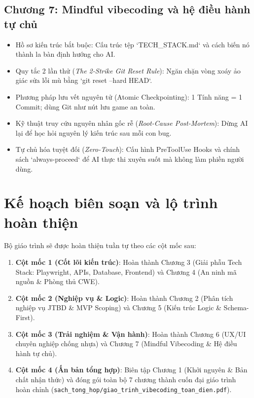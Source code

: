 \documentclass[a4paper,11pt]{article}
\begin{document}
\subsection{Chương 7: Mindful vibecoding và hệ điều hành tự chủ}
\begin{itemize}[leftmargin=1.5em]
    \item Hồ sơ kiến trúc bắt buộc: Cấu trúc tệp `TECH\_STACK.md` và cách biến nó thành la bàn định hướng cho AI.
    \item Quy tắc 2 lần thử (\textit{The 2-Strike Git Reset Rule}): Ngăn chặn vòng xoáy ảo giác sửa lỗi mù bằng `git reset --hard HEAD`.
    \item Phương pháp lưu vết nguyên tử (Atomic Checkpointing): 1 Tính năng = 1 Commit; dùng Git như nút lưu game an toàn.
    \item Kỹ thuật truy cứu nguyên nhân gốc rễ (\textit{Root-Cause Post-Mortem}): Dừng AI lại để học hỏi nguyên lý kiến trúc sau mỗi con bug.
    \item Tự chủ hóa tuyệt đối (\textit{Zero-Touch}): Cấu hình PreToolUse Hooks và chính sách `always-proceed` để AI thực thi xuyên suốt mà không làm phiền người dùng.
\end{itemize}

\section{Kế hoạch biên soạn và lộ trình hoàn thiện}

Bộ giáo trình sẽ được hoàn thiện tuần tự theo các cột mốc sau:
\begin{enumerate}[label={\arabic*.}]
    \item \textbf{Cột mốc 1 (Cốt lõi kiến trúc)}: Hoàn thành Chương 3 (Giải phẫu Tech Stack: Playwright, APIs, Database, Frontend) và Chương 4 (An ninh mã nguồn \& Phòng thủ CWE).
    \item \textbf{Cột mốc 2 (Nghiệp vụ \& Logic)}: Hoàn thành Chương 2 (Phân tích nghiệp vụ JTBD \& MVP Scoping) và Chương 5 (Kiến trúc Logic \& Schema-First).
    \item \textbf{Cột mốc 3 (Trải nghiệm \& Vận hành)}: Hoàn thành Chương 6 (UX/UI chuyên nghiệp chống nhựa) và Chương 7 (Mindful Vibecoding \& Hệ điều hành tự chủ).
    \item \textbf{Cột mốc 4 (Ấn bản tổng hợp)}: Biên tập Chương 1 (Khởi nguyên \& Bản chất nhận thức) và đóng gói toàn bộ 7 chương thành cuốn đại giáo trình hoàn chỉnh (\texttt{sach\_tong\_hop/giao\_trinh\_vibecoding\_toan\_dien.pdf}).
\end{enumerate}
\end{document}
